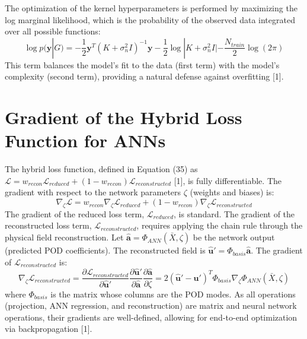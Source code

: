 \documentclass[dsc, EN]{ufabcFHZh}
\begin{document}
{The optimization of the kernel hyperparameters is performed by maximizing the log marginal likelihood, which is the probability of the observed data integrated over all possible functions:
\begin{equation}
    \log p(\mathbf{y} | G) = -\frac{1}{2} \mathbf{y}^T (K + \sigma_n^2 I)^{-1} \mathbf{y} - \frac{1}{2} \log |K + \sigma_n^2 I| - \frac{N_{train}}{2} \log(2\pi)
\end{equation}
This term balances the model's fit to the data (first term) with the model's complexity (second term), providing a natural defense against overfitting {[1]}.

\section{Gradient of the Hybrid Loss Function for ANNs}
\label{sec:loss_derivation}

The hybrid loss function, defined in Equation (35) as $\mathcal{L} = w_{recon}\mathcal{L}_{reduced} + (1 - w_{recon})\mathcal{L}_{reconstructed}$ {[1]}, is fully differentiable. The gradient with respect to the network parameters $\zeta$ (weights and biases) is:
\begin{equation}
    \nabla_\zeta \mathcal{L} = w_{recon} \nabla_\zeta \mathcal{L}_{reduced} + (1 - w_{recon}) \nabla_\zeta \mathcal{L}_{reconstructed}
\end{equation}
The gradient of the reduced loss term, $\mathcal{L}_{reduced}$, is standard. The gradient of the reconstructed loss term, $\mathcal{L}_{reconstructed}$, requires applying the chain rule through the physical field reconstruction. Let $\hat{\mathbf{a}} = \Phi_{ANN}(\bar{X}, \zeta)$ be the network output (predicted POD coefficients). The reconstructed field is $\hat{\mathbf{u}}' = \Phi_{basis} \hat{\mathbf{a}}$. The gradient of $\mathcal{L}_{reconstructed}$ is:
\begin{equation}
    \nabla_\zeta \mathcal{L}_{reconstructed} = \frac{\partial \mathcal{L}_{reconstructed}}{\partial \hat{\mathbf{u}}'} \frac{\partial \hat{\mathbf{u}}'}{\partial \hat{\mathbf{a}}} \frac{\partial \hat{\mathbf{a}}}{\partial \zeta} = 2(\hat{\mathbf{u}}' - \mathbf{u}')^T \Phi_{basis} \nabla_\zeta \Phi_{ANN}(\bar{X}, \zeta)
\end{equation}
where $\Phi_{basis}$ is the matrix whose columns are the POD modes. As all operations (projection, ANN regression, and reconstruction) are matrix and neural network operations, their gradients are well-defined, allowing for end-to-end optimization via backpropagation {[1]}.

}
\end{document}
